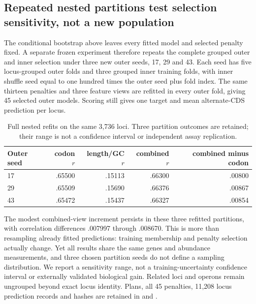 \subsection{Repeated nested partitions test selection sensitivity, not a new population}
The conditional bootstrap above leaves every fitted model and selected penalty fixed. A separate frozen experiment therefore repeats the complete grouped outer and inner selection under three new outer seeds, 17, 29 and 43. Each seed has five locus-grouped outer folds and three grouped inner training folds, with inner shuffle seed equal to one hundred times the outer seed plus fold index. The same thirteen penalties and three feature views are refitted in every outer fold, giving 45 selected outer models. Scoring still gives one target and mean alternate-CDS prediction per locus.
\begin{table}[ht]\centering
\caption{Full nested refits on the same 3,736 loci. Three partition outcomes are retained; their range is not a confidence interval or independent assay replication.}
\begin{tabular}{lrrrr}\hline
Outer seed & codon $r$ & length/GC $r$ & combined $r$ & combined minus codon\\\hline
17&.65500&.15113&.66300&.00800\\
29&.65509&.15690&.66376&.00867\\
43&.65472&.15437&.66327&.00854\\\hline
\end{tabular}\end{table}
The modest combined-view increment persists in these three refitted partitions, with correlation differences .007997 through .008670. This is more than resampling already fitted predictions: training membership and penalty selection actually change. Yet all results share the same genes and abundance measurements, and three chosen partition seeds do not define a sampling distribution. We report a sensitivity range, not a training-uncertainty confidence interval or externally validated biological gain. Related loci and operons remain ungrouped beyond exact locus identity. Plans, all 45 penalties, 11,208 locus prediction records and hashes are retained in  and .


